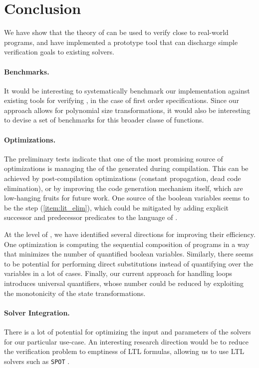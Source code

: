 \section{Conclusion}
\label{sec:conclusion}

We have show that the theory of  can be
used to verify close to real-world programs, and have implemented a prototype
tool that can discharge simple verification goals to existing solvers.

\paragraph{Benchmarks.} It would be interesting to systematically benchmark our
implementation against existing tools for verifying , in the case of first order specifications. Since our approach
allows for polynomial size transformations, it would also be interesting to
devise a set of benchmarks for this broader classe of functions.

\paragraph{Optimizations.} The preliminary tests indicate that one of the most
promising source of optimizations is managing the  of the
generated  during compilation. This can be achieved by
post-compilation optimizations (constant propagation, dead code elimination),
or by improving the code generation mechanism itself, which are low-hanging
fruits for future work. One source of the boolean variables seems to be the
 step (\ref{item:lit_elim}), which could be
mitigated by adding explicit successor and predecessor predicates to the
language of .

At the level of , we have identified several
directions for improving their efficiency. One optimization is computing the
sequential composition of programs in a way that minimizes the number of
quantified boolean variables. Similarly, there seems to be potential for
performing direct substitutions instead of quantifying over the variables in a
lot of cases. Finally, our current approach for handling loops introduces
universal quantifiers, whose number could be reduced by exploiting the
monotonicity of the state transformations.
    
\paragraph{Solver Integration.} There is a lot of potential for optimizing the
input and parameters of the solvers for our particular use-case. An interesting
research direction would be to reduce the verification problem to emptiness of
LTL formulas, allowing us to use LTL solvers such as \texttt{SPOT} \cite{SPOT}.

